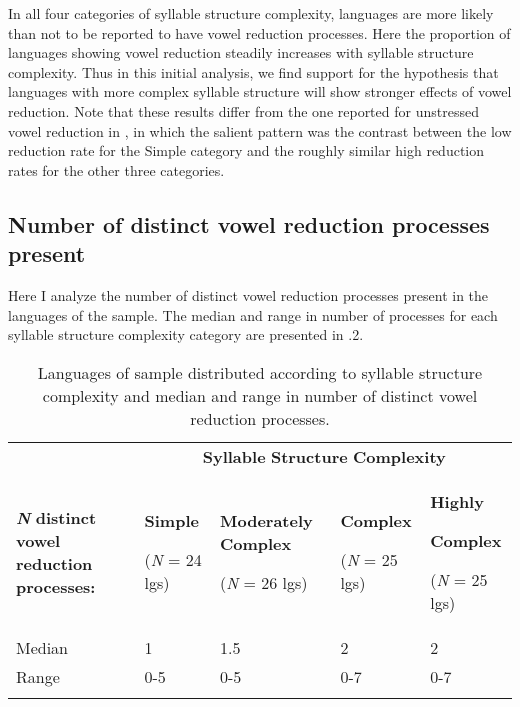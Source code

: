   In all four categories of syllable structure complexity, languages are more likely than not to be reported to have vowel reduction processes. Here the proportion of languages showing vowel reduction steadily increases with syllable structure complexity. Thus in this initial analysis, we find support for the hypothesis that languages with more complex syllable structure will show stronger effects of vowel reduction. Note that these results differ from the one reported for unstressed vowel reduction in , in which the salient pattern was the contrast between the low reduction rate for the Simple category and the roughly similar high reduction rates for the other three categories.

\subsection{Number of distinct vowel reduction processes present}\label{sec:6.3.2}

  Here I analyze the number of distinct vowel reduction processes present in the languages of the sample. The median and range in number of processes for each syllable structure complexity category are presented in .2.

\begin{table}
\begin{tabularx}{\textwidth}{XXXXX}
\lsptoprule
 & \multicolumn{4}{c}{ \textbf{Syllable} \textbf{Structure} \textbf{Complexity}}\\
 \textbf{\textit{N}} \textbf{distinct} \textbf{vowel} \textbf{reduction} \textbf{processes:} & { \textbf{Simple}}

 (\textit{N} = 24 lgs) & { \textbf{Moderately} \textbf{Complex}}

 (\textit{N} = 26 lgs) & { \textbf{Complex}}

 (\textit{N} = 25 lgs) & { \textbf{Highly} }

{ \textbf{Complex}}

 (\textit{N} = 25 lgs)\\
 Median & 1 & 1.5 & 2 & 2\\
 Range & 0-5 & 0-5 & 0-7 & 0-7\\
\lspbottomrule
\end{tabularx}
\caption{\label{6.2}Languages of sample distributed according to syllable structure complexity and median and range in number of distinct vowel reduction processes.}
\end{table}

